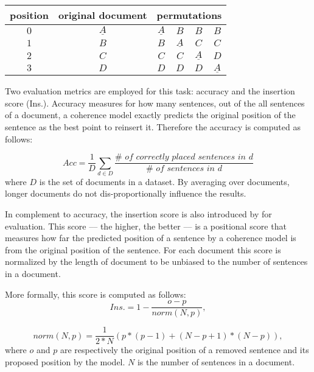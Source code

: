 \begin{table}[!ht]
\centering
\begin{small}
\begin{tabular}{cc|cccc}
position & original document  & \multicolumn{4}{c}{permutations}\\
\hline
$0$ & $\underline{A}$ & $\underline{A}$ & $B$ & $B$ & $B$\\
$1$ & $B$ 			  & $B$  & $\underline{A}$ & $C$ & $C$\\
$2$ & $C$			  & $C$ & $C$ & $\underline{A}$ & $D$\\
$3$ & $D$			  & $D$ & $D$ & $D$ & $\underline{A}$\\
\end{tabular}
\end{small}
\caption{}
\label{table:insertion_task}  
\end{table}

Two evaluation metrics are employed for this task: accuracy and the insertion score (Ins.). 
Accuracy measures for how many sentences, out of the all sentences of a document, a coherence model exactly predicts the original position of the sentence as the best point to reinsert it. 
Therefore the accuracy is computed as follows:

\begin{equation}
Acc = \frac{1}{D}\sum_{d \in D}\frac{\#\textit{ of correctly placed sentences in d}}{\#\textit{ of sentences in d}}
\end{equation}
%
where $D$ is the set of documents in a dataset.  
By averaging over documents, longer documents do not dis-proportionally influence the results. 

In complement to accuracy, the insertion score is also introduced by  for evaluation. 
This score  –-- the higher, the better –--  is a positional score that measures how far the predicted position of a sentence by a coherence model is from the original position of the sentence. 
For each document this score is normalized by the length of document to be unbiased to the number of sentences in a document. 

More formally, this score is computed as follows:
\begin{equation}
Ins. = 1 - \frac{o - p}{norm(N, p)},
\end{equation}


\begin{equation}
norm(N, p) = \frac{1}{2*N} (p * (p-1) + (N - p + 1)*(N - p)),
\end{equation}
where $o$ and $p$ are respectively the original position of a removed sentence and its proposed position by the model. 
$N$ is the number of sentences in a document.  


